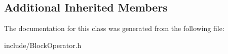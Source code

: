 \subsection*{Additional Inherited Members}


The documentation for this class was generated from the following file\+:\begin{DoxyCompactItemize}
\item 
include/Block\+Operator.\+h\end{DoxyCompactItemize}

